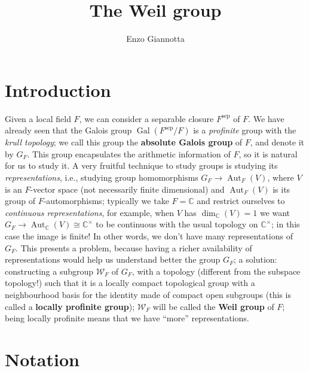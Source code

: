 \documentclass[12pt]{article}
\title{The Weil group}
\author{Enzo Giannotta}
\theoremstyle{plain}
\theoremstyle{definition}
\newcommand{\complex}{\mathbb{C}}
\newcommand{\Gal}[2]{\operatorname{Gal} ( #1 / #2 )}
\newcommand{\sep}[1]{{#1}^{\operatorname{sep}}}
\newcommand{\weil}[1]{\mathcal W_{#1}}
\begin{document}
\maketitle


\tableofcontents



\section{Introduction}

Given a local field $F$, we can consider a separable closure $\sep F$ of $F$. We have already seen that the Galois group $\Gal { \sep F} F$ is a \textit{profinite} group with the \textit{krull topology}; we call this group the \textbf{absolute Galois group} of $F$, and denote it by $G_F$. This group encapsulates the arithmetic information of $F$, so it is natural for us to study it. A very fruitful technique to study groups is studying its \textit{representations}, i.e., studying group homomorphisms $G_F \to \operatorname{Aut}_F (V)$, where $V$ is an $F$-vector space (not necessarily finite dimensional) and $\operatorname{Aut}_F (V)$ is its group of $F$-automorphisms; typically we take $F = \complex$ and restrict ourselves to \textit{continuous representations}, for example, when $V$ has $\dim_{\complex} (V) = 1$ we want $G_F \to \operatorname{Aut}_\complex (V) \cong \complex^\times$ to be continuous with the usual topology on $\complex^\times$; in this case the image is finite! In other words, we don't have many representations of $G_F$. This presents a problem, because having a richer availability of representations would help us understand better the group $G_F$; a solution: constructing a subgroup $\weil F$ of $G_F$, with a topology (different from the subspace topology!) such that it is a locally compact topological group with a neighbourhood basis for the identity made of compact open subgroups (this is called a \textbf{locally profinite group}); $\weil F$ will be called the \textbf{Weil group} of $F$; being locally profinite means that we have ``more'' representations.

\section{Notation}
\end{document}
